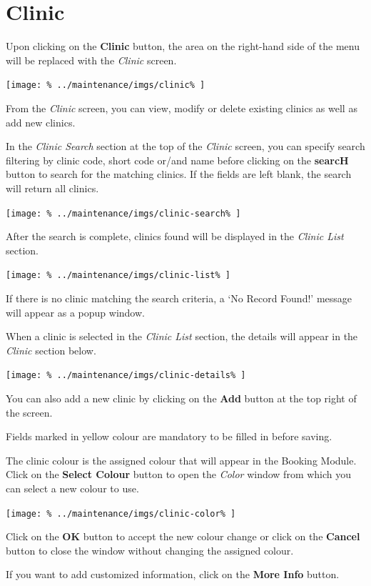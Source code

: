 \documentclass[../main/main]{subfiles}
\begin{document}
\newpage
\section{Clinic}
\label{sec:clinic}

Upon clicking on the \textbf{Clinic} button,
the area on the right-hand side of the menu will be replaced with the
\emph{Clinic} screen.

\texttt{[image: \%
  ../maintenance/imgs/clinic\%
]}

From the \emph{Clinic} screen, you can view, modify or delete existing clinics
as well as add new clinics.

In the \emph{Clinic Search} section at the top of the \emph{Clinic} screen,
you can specify search filtering by clinic code, short code or/and name before
clicking on the \textbf{searcH} button to search for the matching clinics. If
the fields are left blank, the search will return all clinics.

\texttt{[image: \%
  ../maintenance/imgs/clinic-search\%
]}

After the search is complete, clinics found will be displayed in the
\emph{Clinic List} section.

\texttt{[image: \%
  ../maintenance/imgs/clinic-list\%
]}

If there is no clinic matching the search criteria, a `No Record Found!'
message will appear as a popup window.

\pagebreak
When a clinic is selected in the \emph{Clinic List} section, the details will
appear in the \emph{Clinic} section below.

\texttt{[image: \%
  ../maintenance/imgs/clinic-details\%
]}

You can also add a new clinic by clicking on the \textbf{Add} button at the
top right of the screen.

Fields marked in yellow colour are mandatory to be filled in before saving.

The clinic colour is the assigned colour that will appear in the Booking Module.
Click on the \textbf{Select Colour} button to open the \emph{Color} window from
which you can select a new colour to use.

\texttt{[image: \%
  ../maintenance/imgs/clinic-color\%
]}

Click on the \textbf{OK} button to
accept the new colour change or click on the \textbf{Cancel} button to close
the window without changing the assigned colour.

\pagebreak
If you want to add customized information, click on the \textbf{More Info}
button.
\end{document}
